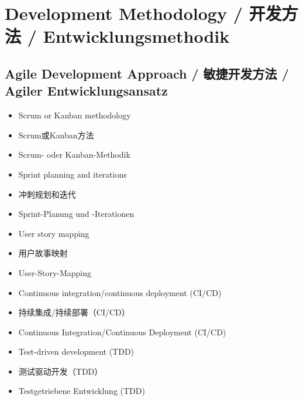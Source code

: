 \section{Development Methodology / 开发方法 / Entwicklungsmethodik}

\subsection{Agile Development Approach / 敏捷开发方法 / Agiler Entwicklungsansatz}
\begin{itemize}
    \item Scrum or Kanban methodology
    \item Scrum或Kanban方法
    \item Scrum- oder Kanban-Methodik
    \item Sprint planning and iterations
    \item 冲刺规划和迭代
    \item Sprint-Planung und -Iterationen
    \item User story mapping
    \item 用户故事映射
    \item User-Story-Mapping
    \item Continuous integration/continuous deployment (CI/CD)
    \item 持续集成/持续部署（CI/CD）
    \item Continuous Integration/Continuous Deployment (CI/CD)
    \item Test-driven development (TDD)
    \item 测试驱动开发（TDD）
    \item Testgetriebene Entwicklung (TDD)
\end{itemize}

